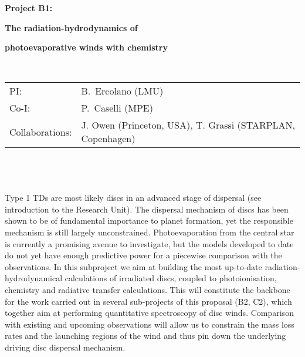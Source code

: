 \documentclass[10pt,fleqn,twoside]{article}
\newcommand{\Tcol}{\color{blue}}
\begin{document}
\newpage


\setcounter{page}{1}

\centerline{\huge\bf\Tcol
%
%
%
%
%
 Project B1:}

\centerline{\huge\bf\Tcol The radiation-hydrodynamics of}

\centerline{\huge\bf\Tcol photoevaporative winds with chemistry}

%
%
%
%
%
\vskip1.0cm

\\
\begin{tabular}{ll}
{\textsf{PI:}}                  & B.~Ercolano (LMU)\\
{\textsf{Co-I:}}                &P.~Caselli (MPE)\\
{\textsf{Collaborations:}}      & J. Owen (Princeton, USA), T. Grassi (STARPLAN, Copenhagen)  \
\end{tabular}


\vspace{1em}
 \\

\vspace{1em}
\\

\\
Type 1 TDs are most likely discs in an advanced stage of dispersal
(see introduction to the Research Unit). The
dispersal mechanism of discs has been shown to be of fundamental importance to planet
formation, yet the responsible mechanism is still largely
unconstrained. Photoevaporation from the central star is currently a
promising avenue to investigate, but the models developed to date do
not yet have enough predictive power for a piecewise comparison with
the observations. In this subproject we aim at building the most
up-to-date radiation-hydrodynamical calculations of irradiated discs, 
coupled to photoionisation, chemistry and radiative transfer
calculations. This will constitute the backbone for the work carried
out in several sub-projects of this proposal (B2, C2), which together
aim at performing quantitative
spectroscopy of disc winds. Comparison with existing and upcoming
observations will allow us to constrain the mass loss rates and the
launching regions of the wind and thus pin down the underlying driving disc
dispersal mechanism. 
\end{document}
